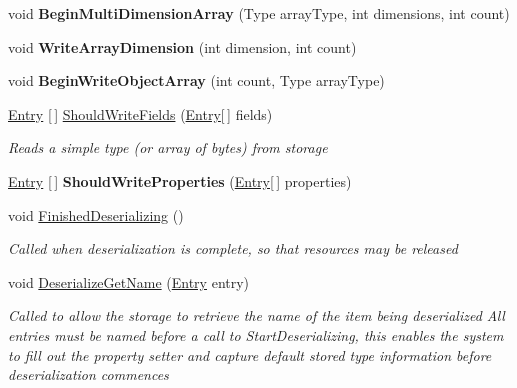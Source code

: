 \begin{DoxyCompactItemize}
void {\bfseries Begin\+Multi\+Dimension\+Array} (Type array\+Type, int dimensions, int count)
\item 
\mbox{\label{class_serialization_1_1_binary_serializer_adf00734419149ffd0f8999876c1120b0}} 
void {\bfseries Write\+Array\+Dimension} (int dimension, int count)
\item 
\mbox{\label{class_serialization_1_1_binary_serializer_ab5c4d7c504b6766c9a1e7ee217ddfce6}} 
void {\bfseries Begin\+Write\+Object\+Array} (int count, Type array\+Type)
\item 
\hyperlink{class_serialization_1_1_entry}{Entry} \mbox{[}$\,$\mbox{]} \hyperlink{class_serialization_1_1_binary_serializer_a1813abad4bdfe9607f093e4df66a4414}{Should\+Write\+Fields} (\hyperlink{class_serialization_1_1_entry}{Entry}\mbox{[}$\,$\mbox{]} fields)
\begin{DoxyCompactList}\small\item\em Reads a simple type (or array of bytes) from storage \end{DoxyCompactList}\item 
\mbox{\label{class_serialization_1_1_binary_serializer_adb05a4a6e028617fe748ae28dc97d7c7}} 
\hyperlink{class_serialization_1_1_entry}{Entry} \mbox{[}$\,$\mbox{]} {\bfseries Should\+Write\+Properties} (\hyperlink{class_serialization_1_1_entry}{Entry}\mbox{[}$\,$\mbox{]} properties)
\item 
void \hyperlink{class_serialization_1_1_binary_serializer_af70f7fb26c0b41d0f1126634df2de03a}{Finished\+Deserializing} ()
\begin{DoxyCompactList}\small\item\em Called when deserialization is complete, so that resources may be released \end{DoxyCompactList}\item 
void \hyperlink{class_serialization_1_1_binary_serializer_ac02802eda1961199b7e91adce7c33de7}{Deserialize\+Get\+Name} (\hyperlink{class_serialization_1_1_entry}{Entry} entry)
\begin{DoxyCompactList}\small\item\em Called to allow the storage to retrieve the name of the item being deserialized All entries must be named before a call to Start\+Deserializing, this enables the system to fill out the property setter and capture default stored type information before deserialization commences \end{DoxyCompactList}\item 

\end{DoxyCompactItemize}
